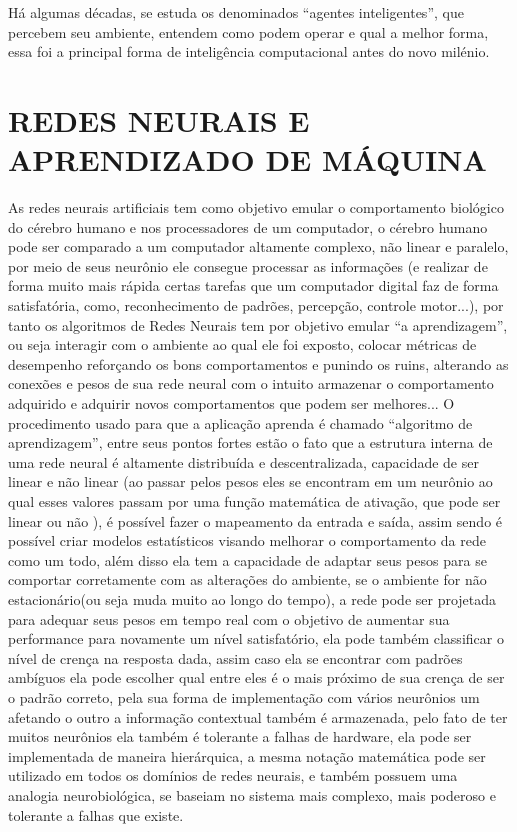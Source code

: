 Há algumas décadas, se estuda os denominados “agentes inteligentes”, que percebem seu ambiente, entendem como podem operar e qual a melhor forma, essa foi a principal forma de inteligência computacional antes do novo milénio.

\section{REDES NEURAIS E APRENDIZADO DE MÁQUINA}
\label{sec:REDESNEURAISEAPRENDIZADODEMÁQUINA}

As redes neurais artificiais tem como objetivo emular o comportamento biológico do cérebro humano e nos processadores de um computador, o cérebro humano pode ser comparado a um computador altamente complexo, não linear e paralelo, por meio de seus neurônio ele consegue processar as informações (e realizar de forma muito mais rápida certas tarefas que um computador digital faz de forma satisfatória, como, reconhecimento de padrões, percepção, controle motor...), por tanto os algoritmos de Redes Neurais tem por objetivo emular “a aprendizagem”, ou seja interagir com o ambiente ao qual ele foi exposto, colocar métricas de desempenho reforçando os bons comportamentos e punindo os  ruins, alterando as conexões e pesos de sua rede neural com o intuito armazenar o comportamento adquirido e adquirir novos comportamentos que podem ser melhores...  
O procedimento usado para que a aplicação aprenda é chamado “algoritmo de aprendizagem”, entre seus pontos fortes estão o fato que a estrutura interna de uma rede neural é altamente distribuída e descentralizada, capacidade de ser linear e não linear (ao passar pelos pesos eles se encontram em um neurônio ao qual esses valores passam por uma função matemática de ativação, que pode ser linear ou não ), é possível fazer o mapeamento da entrada e  saída, assim sendo é possível criar modelos estatísticos visando melhorar o comportamento da rede como um todo, além disso ela tem a capacidade de adaptar seus pesos para se comportar corretamente com as alterações do ambiente, se o ambiente for não estacionário(ou seja muda muito ao longo do tempo), a rede pode ser projetada para adequar seus pesos em tempo real com o objetivo de aumentar sua performance para novamente um nível satisfatório, ela pode também classificar o nível de crença na resposta dada, assim caso ela se encontrar com padrões ambíguos ela pode escolher qual entre eles é o mais próximo de sua crença de ser o padrão correto, pela sua forma de implementação com vários neurônios um afetando o outro a informação contextual também é armazenada, pelo fato de ter muitos neurônios ela também é tolerante a falhas de hardware, ela pode ser implementada de maneira hierárquica, a mesma notação matemática pode ser utilizado em todos os domínios de redes neurais, e também possuem uma analogia neurobiológica, se baseiam no sistema mais complexo, mais poderoso e tolerante a falhas que existe. \cite{haykin2007redes}

